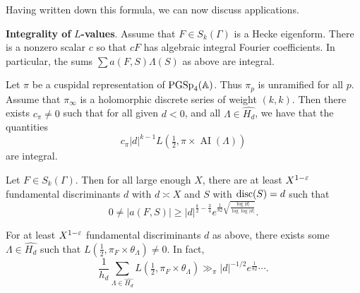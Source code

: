 \documentclass[reqno]{amsart} 
\begin{document}
Having written down this formula, we can now discuss applications.

\textbf{Integrality of} $L$\textbf{-values}.  Assume that $F \in S_k(\Gamma)$ is a Hecke eigenform.  There is a nonzero scalar $c$ so that $c F$ has algebraic integral Fourier coefficients.  In particular, the sums $\sum a(F, S) \Lambda(S)$ as above are integral.
\begin{theorem}\label{theorem:cnfg5jynuf}
  Let $\pi$ be a cuspidal representation of $\operatorname{PGSp}_4(\mathbb{A})$.  Thus $\pi_p$ is unramified for all $p$.  Assume that $\pi _\infty $ is a holomorphic discrete series of weight $(k, k)$.  Then there exists $c_\pi \neq 0$ such that for all given $d< 0$, and all $\Lambda \in \widehat{H_d}$, we have that the quantities
  \begin{equation*}
    c_\pi \lvert d  \rvert^{k - 1} L(\tfrac{1}{2}, \pi \times \operatorname{AI}(\Lambda))
  \end{equation*}
  are integral.
\end{theorem}

\begin{theorem} \label{theorem:cnfg5kcowe}
  Let $F \in S_k(\Gamma)$.  Then for all large enough $X$, there are at least $X^{1 - \varepsilon}$ fundamental discriminants $d$ with $d \asymp X$ and $S$ with $\operatorname{disc}(S) = d$ such that
  \begin{equation*}
    0 \neq \lvert a(F, S) \rvert \geq \lvert d \rvert^{\frac{k}{2} - \frac{3}{4}}
    e^{\frac{1}{82} \sqrt{\frac{\log \lvert d \rvert}{\log \log \lvert d \rvert}}}.    
  \end{equation*}
\end{theorem}
\begin{corollary}\label{corollary:cnfg5kcqax}
  For at least $X^{1 - \varepsilon}$ fundamental discriminants $d$ as above, there exists some $\Lambda \in \widehat{H_d}$ such that $L(\tfrac{1}{2}, \pi_F \times \theta_\Lambda) \neq 0$.  In fact,
  \begin{equation*}
    \frac{1}{h_d } \sum_{\Lambda \in \widehat{H_d}} L(\tfrac{1}{2}, \pi_F \times \theta_\Lambda) \gg_\pi \lvert d \rvert^{-1/2} e^{\frac{1}{82}} \dotsb.
  \end{equation*}
\end{corollary}
\end{document}
